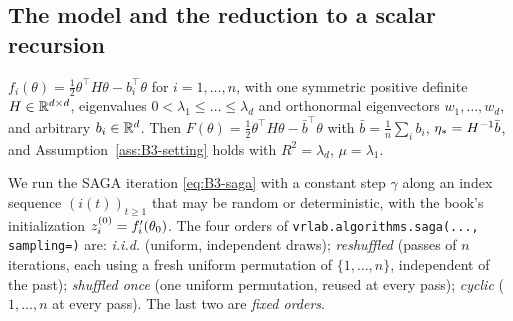 \subsection{The model and the reduction to a scalar recursion}\label{sec:B4-model}

\begin{assumption}\label{ass:B4-model}
$f_i(\theta)=\frac12\theta^\top H\theta-b_i^\top\theta$ for $i=1,\dots,n$, with one symmetric positive definite $H\in\mathbb{R}^{d\times d}$, eigenvalues $0<\lambda_1\le\dots\le\lambda_d$ and orthonormal eigenvectors $w_1,\dots,w_d$, and arbitrary $b_i\in\mathbb{R}^d$. Then $F(\theta)=\frac12\theta^\top H\theta-\bar b^\top\theta$ with $\bar b=\frac1n\sum_ib_i$, $\eta_\ast=H^{-1}\bar b$, and Assumption~\ref{ass:B3-setting} holds with $R^2=\lambda_d$, $\mu=\lambda_1$.
\end{assumption}

We run the SAGA iteration \eqref{eq:B3-saga} with a constant step $\gamma$ along an index sequence $(i(t))_{t\ge1}$ that may be random or deterministic, with the book's initialization $z_i^{(0)}=f'_i(\theta_0)$. The four orders of \texttt{vrlab.algorithms.saga(..., sampling=)} are: \emph{i.i.d.} (uniform, independent draws); \emph{reshuffled} (passes of $n$ iterations, each using a fresh uniform permutation of $\{1,\dots,n\}$, independent of the past); \emph{shuffled once} (one uniform permutation, reused at every pass); \emph{cyclic} ($1,\dots,n$ at every pass). The last two are \emph{fixed orders}.

